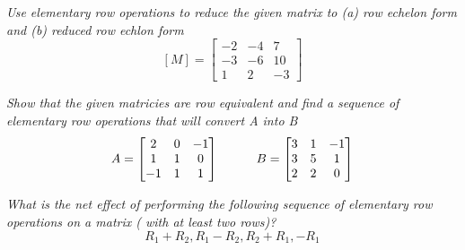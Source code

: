 \documentclass[12pt,letterpaper]{hmcpset}
\begin{document}
\section*{}

\begin{problem}[2.2.14]
\textit{Use elementary row operations to reduce the given matrix to (a) row echelon form and (b) reduced row echlon form}
$$[M]=\begin{bmatrix}
-2 & -4 & 7 \\ -3 & -6 & 10 \\ 1 & 2 & -3
\end{bmatrix} 
$$
\end{problem}

\begin{solution}

\end{solution}

\newpage

\begin{problem}[2.2.18]
\textit{Show that the given matricies are row equivalent and find a sequence of elementary row operations that will convert A into B }
$$ 
A = \begin{bmatrix}
	2&0&-1\\
	1&1&0\\
	-1&1&1
\end{bmatrix}
\indent \indent  
B=\begin{bmatrix}
	3&1&-1\\
	3&5&1\\
	2&2&0
\end{bmatrix}
$$
\end{problem}

\begin{solution}

\end{solution}

\newpage

\begin{problem}[2.2.20]
\textit{What is the net effect of performing the following sequence of elementary row operations on a matrix ( with at least two rows)? }
$$ R_1+ R_2, R_1-R_2, R_2+R_1, -R_1 $$
\end{problem}
\end{document}
